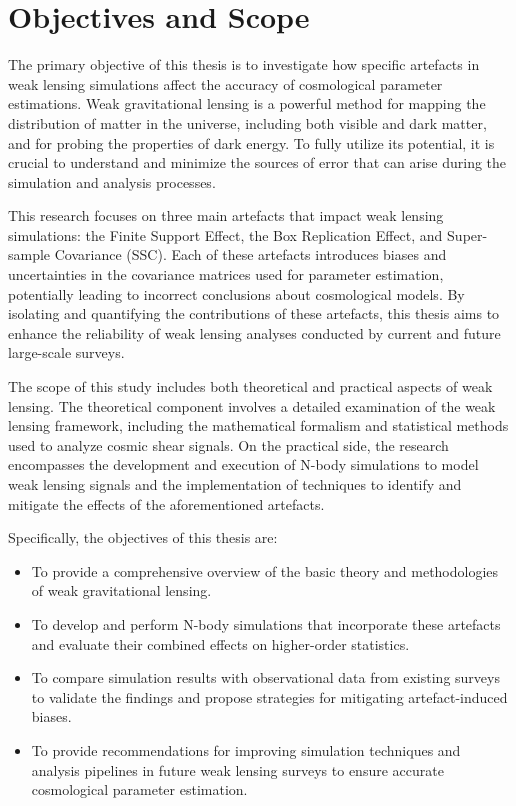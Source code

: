 \section{Objectives and Scope}
The primary objective of this thesis is to investigate how specific artefacts in weak lensing simulations affect the accuracy of cosmological parameter estimations. Weak gravitational lensing is a powerful method for mapping the distribution of matter in the universe, including both visible and dark matter, and for probing the properties of dark energy. To fully utilize its potential, it is crucial to understand and minimize the sources of error that can arise during the simulation and analysis processes.

This research focuses on three main artefacts that impact weak lensing simulations: the Finite Support Effect, the Box Replication Effect, and Super-sample Covariance (SSC). Each of these artefacts introduces biases and uncertainties in the covariance matrices used for parameter estimation, potentially leading to incorrect conclusions about cosmological models. By isolating and quantifying the contributions of these artefacts, this thesis aims to enhance the reliability of weak lensing analyses conducted by current and future large-scale surveys.

The scope of this study includes both theoretical and practical aspects of weak lensing. The theoretical component involves a detailed examination of the weak lensing framework, including the mathematical formalism and statistical methods used to analyze cosmic shear signals. On the practical side, the research encompasses the development and execution of N-body simulations to model weak lensing signals and the implementation of techniques to identify and mitigate the effects of the aforementioned artefacts.

Specifically, the objectives of this thesis are:
\begin{itemize}
    \item To provide a comprehensive overview of the basic theory and methodologies of weak gravitational lensing.
    \item To develop and perform N-body simulations that incorporate these artefacts and evaluate their combined effects on higher-order statistics.
    \item To compare simulation results with observational data from existing surveys to validate the findings and propose strategies for mitigating artefact-induced biases.
    \item To provide recommendations for improving simulation techniques and analysis pipelines in future weak lensing surveys to ensure accurate cosmological parameter estimation.
\end{itemize}

